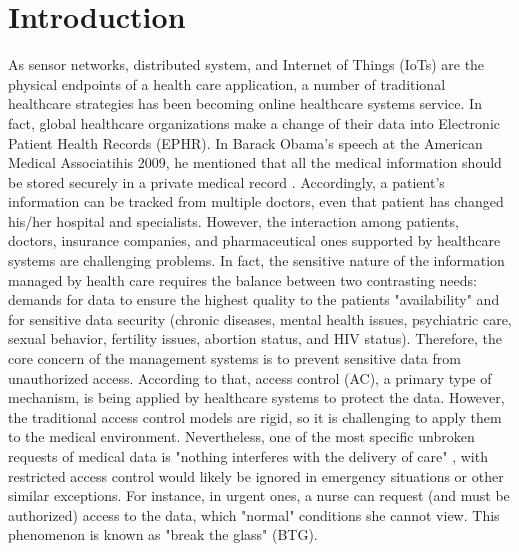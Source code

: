 \documentclass[conference]{IEEEtran}
\begin{document}
\section{Introduction}\label{sec:intro}
As sensor networks, distributed system, and Internet of Things (IoTs) are the physical endpoints of a health care application, a number of traditional healthcare strategies has been becoming online healthcare systems service.
In fact, global healthcare organizations make a change of their data into Electronic Patient Health Records (EPHR).
In Barack Obama's speech at the American Medical Associatihis 2009, he mentioned that all the medical information should be stored securely in a private medical record \cite{zhang2014role}. 
Accordingly, a patient's information can be tracked from multiple doctors, even that patient has changed his/her hospital and specialists.
However, the interaction among patients, doctors, insurance companies, and pharmaceutical ones supported by healthcare systems are challenging problems. 
In fact, the sensitive nature of the information managed by health care requires the balance between two contrasting needs: demands for data to ensure the highest quality to the patients "availability" and for sensitive data security (chronic diseases, mental health issues, psychiatric care, sexual behavior, fertility issues, abortion status, and HIV status). 
Therefore, the core concern of the management systems is to prevent sensitive data from unauthorized access. 
According to that, access control (AC), a primary type of mechanism, is being applied by healthcare systems to protect the data. 
However, the traditional access control models are rigid, so it is challenging to apply them to the medical environment. 
Nevertheless, one of the most specific unbroken requests of medical data is "nothing interferes with the delivery of care" \cite{grandison2007impact}, with restricted access control would likely be ignored in emergency situations or other similar exceptions. 
For instance, in urgent ones, a nurse can request (and must be authorized) access to the data, which "normal" conditions she cannot view. 
This phenomenon is known as "break the glass" (BTG).
\end{document}
